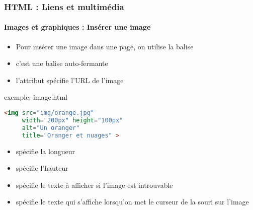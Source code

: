 \documentclass[xcolor=table]{beamer}
\begin{document}
\begin{frame}[fragile]
\frametitle{HTML : Liens et multimédia}
\framesubtitle{Images et graphiques : Insérer une image}

\begin{minipage}{0.50\textwidth} 
	\begin{itemize}
		\item Pour insérer une image dans une page, on utilise la balise 
		\item c'est une balise auto-fermante
		\item l'attribut  spécifie l'URL de l'image
	\end{itemize}
\end{minipage}
%
\begin{minipage}{0.49\textwidth}
\begin{exampleblock}{exemple: image.html}
\lstset{escapeinside=**}
\scriptsize\bfseries\vspace{-6pt}
\begin{lstlisting}[language={html}]
<img src="img/orange.jpg"
     width="200px" height="100px"
     alt="Un oranger" 
     title="Oranger et nuages" >
\end{lstlisting}\vspace{-6pt}
\end{exampleblock}
\end{minipage}

\begin{itemize}
	\item {} spécifie la longueur 
	\item {} spécifie l'hauteur
	\item {} spécifie le texte à afficher si l'image est introuvable 
	\item {} spécifie le texte qui s'affiche lorsqu'on met le curseur de la souri sur l'image
\end{itemize}

\end{frame} 
\end{document}
